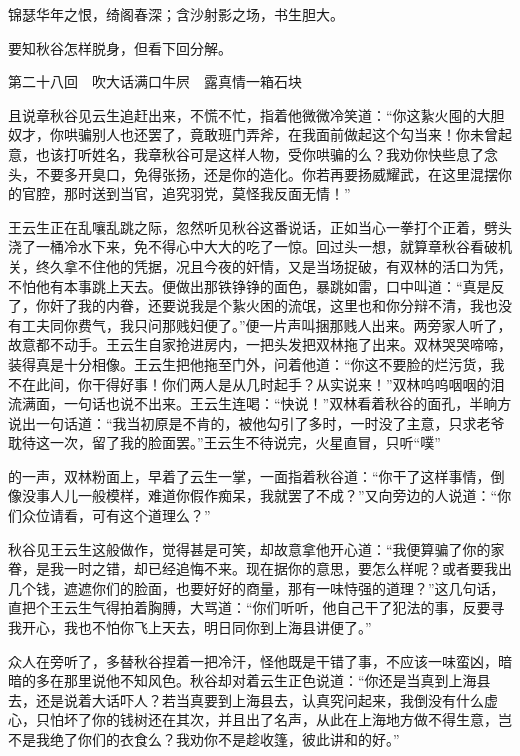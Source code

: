 \documentclass[12pt,UTF8]{ctexbook}
\begin{document}
{{{锦瑟华年之恨，绮阁春深；含沙射影之场，书生胆大。

要知秋谷怎样脱身，但看下回分解。





第二十八回　吹大话满口牛屄　露真情一箱石块





且说章秋谷见云生追赶出来，不慌不忙，指着他微微冷笑道：“你这紥火囤的大胆奴才，你哄骗别人也还罢了，竟敢班门弄斧，在我面前做起这个勾当来！你未曾起意，也该打听姓名，我章秋谷可是这样人物，受你哄骗的么？我劝你快些息了念头，不要多开臭口，免得张扬，还是你的造化。你若再要扬威耀武，在这里混摆你的官腔，那时送到当官，追究羽党，莫怪我反面无情！”

王云生正在乱嚷乱跳之际，忽然听见秋谷这番说话，正如当心一拳打个正着，劈头浇了一桶冷水下来，免不得心中大大的吃了一惊。回过头一想，就算章秋谷看破机关，终久拿不住他的凭据，况且今夜的奸情，又是当场捉破，有双林的活口为凭，不怕他有本事跳上天去。便做出那铁铮铮的面色，暴跳如雷，口中叫道：“真是反了，你奸了我的内眷，还要说我是个紥火困的流氓，这里也和你分辩不清，我也没有工夫同你费气，我只问那贱妇便了。”便一片声叫捆那贱人出来。两旁家人听了，故意都不动手。王云生自家抢进房内，一把头发把双林拖了出来。双林哭哭啼啼，装得真是十分相像。王云生把他拖至门外，问着他道：“你这不要脸的烂污货，我不在此间，你干得好事！你们两人是从几时起手？从实说来！”双林呜呜咽咽的泪流满面，一句话也说不出来。王云生连喝：“快说！”双林看着秋谷的面孔，半晌方说出一句话道：“我当初原是不肯的，被他勾引了多时，一时没了主意，只求老爷耽待这一次，留了我的脸面罢。”王云生不待说完，火星直冒，只听“噗”

的一声，双林粉面上，早着了云生一掌，一面指着秋谷道：“你干了这样事情，倒像没事人儿一般模样，难道你假作痴呆，我就罢了不成？”又向旁边的人说道：“你们众位请看，可有这个道理么？”

秋谷见王云生这般做作，觉得甚是可笑，却故意拿他开心道：“我便算骗了你的家眷，是我一时之错，却已经追悔不来。现在据你的意思，要怎么样呢？或者要我出几个钱，遮遮你们的脸面，也要好好的商量，那有一味恃强的道理？”这几句话，直把个王云生气得拍着胸膊，大骂道：“你们听听，他自己干了犯法的事，反要寻我开心，我也不怕你飞上天去，明日同你到上海县讲便了。”

众人在旁听了，多替秋谷捏着一把冷汗，怪他既是干错了事，不应该一味蛮凶，暗暗的多在那里说他不知风色。秋谷却对着云生正色说道：“你还是当真到上海县去，还是说着大话吓人？若当真要到上海县去，认真究问起来，我倒没有什么虚心，只怕坏了你的钱树还在其次，并且出了名声，从此在上海地方做不得生意，岂不是我绝了你们的衣食么？我劝你不是趁收篷，彼此讲和的好。”

}}}
\end{document}

